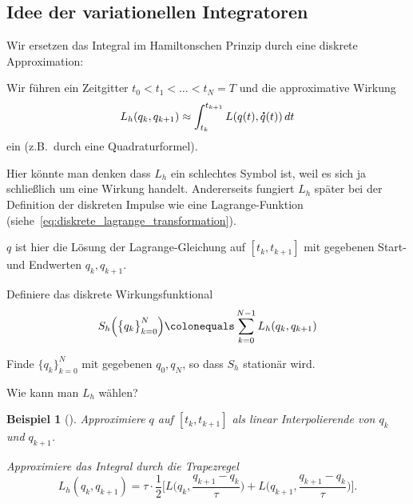 \documentclass[german]{scrreprt}
\theoremstyle{plain}
\theoremstyle{nonumberplain}
\theoremstyle{nonumberplain}
\newtheorem{bsp}{Beispiel}
\theoremstyle{nonumberplain}
\renewcommand*{\dot}[1]{\accentset{\mbox{\large\bfseries .}}{#1}}
\begin{document}

\renewcommand*\contentsname{\huge \centering Optimierung \& Numerik --- Vorlesung 19}
\tableofcontents


\setcounter{chapter}{12}
\setcounter{section}{5}
\setcounter{satz}{8}
\setcounter{lemma}{1}
\setcounter{equation}{4}

\subsection{Idee der variationellen Integratoren}

Wir ersetzen das Integral im Hamiltonschen Prinzip durch eine diskrete Approximation:

Wir führen ein Zeitgitter $t_0<t_1<\hdots < t_N = T$ und die approximative Wirkung
\begin{equation*}
L_h(q_k,q_{k+1})\approx \int_{t_k}^{t_{k+1}} L(q(t),\dot q(t))\,dt
\end{equation*}
ein (z.B.\ durch eine Quadraturformel).

Hier könnte man denken dass $L_h$ ein schlechtes Symbol ist, weil es sich ja schließlich um eine Wirkung handelt. Andererseits fungiert $L_h$ später bei der Definition der diskreten Impulse wie eine Lagrange-Funktion (siehe~\eqref{eq:diskrete_lagrange_transformation}).

$q$ ist hier die Lösung der Lagrange-Gleichung auf $[t_k,t_{k+1}]$ mit gegebenen Start- und Endwerten $q_k,q_{k+1}$.

Definiere das diskrete Wirkungsfunktional
\begin{equation*}
S_h\Big(\big\{q_k\big\}_{k=0}^N\Big) \colonequals \sum_{k=0}^{N-1} L_h(q_k,q_{k+1})
\end{equation*}

\begin{definition}
	Finde $\{q_k\}^N_{k=0}$  mit gegebenen $q_0, q_N$, so dass $S_h$ stationär wird.
\end{definition}

Wie kann man $L_h$ wählen?

\begin{bsp}[{{\cite[1992]{mackay:1992}}}]
	Approximiere $q$ auf $[t_k, t_{k+1}]$ als linear Interpolierende von $q_k$ und $q_{k+1}$.
	
	Approximiere das Integral durch die Trapezregel
	\begin{equation*}
	L_h(q_k, q_{k+1}) =
	\tau \cdot \frac{1}{2} \Big[L\Big(q_k, \frac{q_{k+1} - q_k}{\tau}\Big) +  L\Big(q_{k+1}, \frac{q_{k+1} - q_k}{\tau}\Big)\Big].
	\end{equation*}
\end{bsp}
\end{document}
